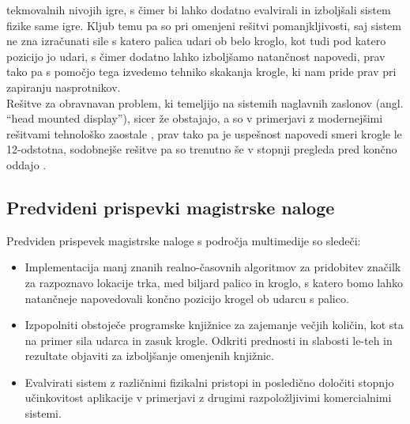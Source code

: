 \documentclass[a4paper, 12pt]{article}
\newcommand\cmnt[1]{\textcolor{munsell}{#1}}
\begin{document}
tekmovalnih nivojih igre, s čimer bi lahko dodatno evalvirali in izboljšali sistem fizike same igre. Kljub temu pa so pri omenjeni rešitvi pomanjkljivosti, saj sistem ne zna izračunati sile s katero palica udari ob belo kroglo, kot tudi pod katero pozicijo jo udari, s čimer
dodatno lahko izboljšamo natančnost napovedi, prav tako pa s pomočjo tega izvedemo tehniko skakanja krogle, ki nam pride prav pri zapiranju nasprotnikov. \\
Rešitve za obravnavan problem, ki temeljijo na sistemih naglavnih zaslonov (angl. ``head mounted display''), sicer že obstajajo, a so v primerjavi z modernejšimi rešitvami tehnološko zaostale \cite{Sargaana2005Collaborative}, prav tako pa je uspešnost napovedi smeri krogle le 12-odstotna, sodobnejše rešitve pa so trenutno še v stopnji pregleda pred končno oddajo \cite{Yan2024Enhancing}.



\subsection{Predvideni prispevki magistrske naloge}
Predviden prispevek magistrske naloge s področja multimedije so sledeči:
\begin{itemize}
    \item Implementacija manj znanih realno-časovnih algoritmov za pridobitev značilk za razpoznavo lokacije trka, med biljard palico in kroglo, s katero bomo lahko natančneje napovedovali končno pozicijo krogel ob udarcu s palico.
    \item Izpopolniti obstoječe programske knjižnice za zajemanje večjih količin, kot sta na primer sila udarca in zasuk krogle. Odkriti prednosti in slabosti le-teh in rezultate objaviti za izboljšanje omenjenih knjižnic.
    \item Evalvirati sistem z različnimi fizikalni pristopi in posledično določiti stopnjo učinkovitost aplikacije v primerjavi z drugimi razpoložljivimi komercialnimi sistemi.
\end{itemize}
\end{document}
